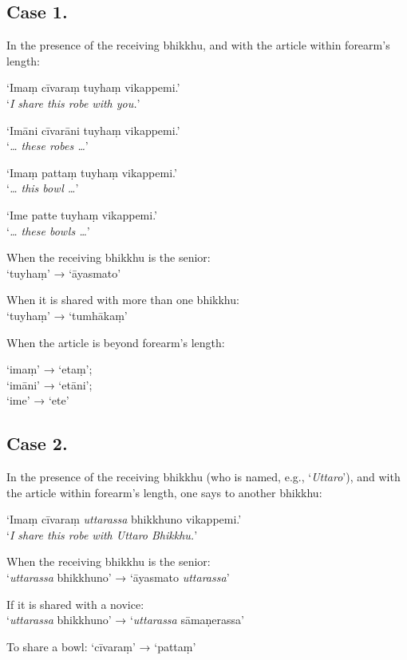 \subsection{Case 1.}

In the presence of the receiving bhikkhu, and with the article within forearm's length:

‘Imaṃ cīvaraṃ tuyhaṃ vikappemi.’\\
‘\emph{I share this robe with you.}’

‘Imāni cīvarāni tuyhaṃ vikappemi.’\\
‘\emph{\ldots{} these robes \ldots{}}’

‘Imaṃ pattaṃ tuyhaṃ vikappemi.’\\
‘\emph{\ldots{} this bowl \ldots{}}’

‘Ime patte tuyhaṃ vikappemi.’\\
‘\emph{\ldots{} these bowls \ldots{}}’

When the receiving bhikkhu is the senior:\\
‘tuyhaṃ’ → ‘āyasmato’

When it is shared with more than one bhikkhu:\\
‘tuyhaṃ’ → ‘tumhākaṃ’

When the article is beyond forearm’s length:

‘imaṃ’ → ‘etaṃ’;\\
‘imāni’ → ‘etāni’;\\
‘ime’ → ‘ete’


\subsection{Case 2.}

In the presence of the receiving bhikkhu (who is named, e.g., ‘\emph{Uttaro}’),
and with the article within forearm's length, one says to another bhikkhu:

‘Imaṃ cīvaraṃ \emph{uttarassa} bhikkhuno vikappemi.’\\
‘\emph{I share this robe with Uttaro Bhikkhu.}’

When the receiving bhikkhu is the senior:\\
‘\emph{uttarassa} bhikkhuno’ → ‘āyasmato \emph{uttarassa}’

If it is shared with a novice:\\
‘\emph{uttarassa} bhikkhuno’ → ‘\emph{uttarassa} sāmaṇerassa’

To share a bowl: ‘cīvaraṃ’ → ‘pattaṃ’


